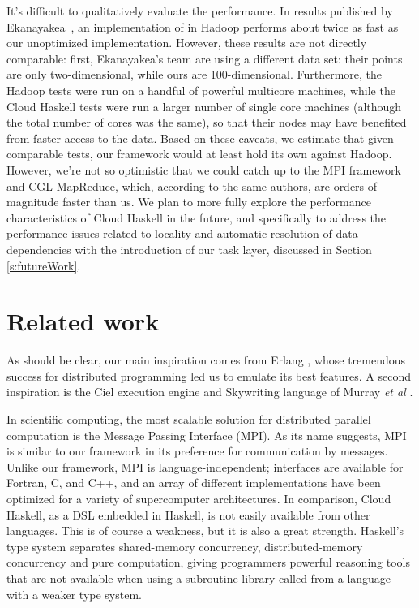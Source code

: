 \documentclass[preprint]{sigplanconf}
\begin{document}
It's difficult to qualitatively evaluate the performance. In results published by Ekanayakea~\cite{indiana}, an implementation of \kmeans{} in Hadoop performs about twice as fast as our unoptimized implementation. 
However, these results are not directly comparable: first, Ekanayakea's team are using a different data set: their points are only two-dimensional, while ours are 100-dimensional. 
Furthermore, the Hadoop tests were run on a handful of powerful multicore machines, while the Cloud Haskell tests were run a larger number of single core machines (although the total number of cores was the same), so that their nodes may have benefited from faster access to the data. 
Based on these caveats, we estimate that given comparable tests, our framework would at least hold its own against Hadoop. 
However, we're not so optimistic that we could catch up to the MPI framework and CGL-MapReduce, which, according to the same authors, are orders of magnitude faster than us. 
We plan to more fully explore the performance characteristics of Cloud Haskell in the future, and specifically to address the performance issues related to locality and automatic resolution of data dependencies with the introduction of our task layer, discussed in Section \ref{s:futureWork}.



\section{Related work} \label{s:related}

As should be clear, our main inspiration comes from Erlang \cite{Erlang93}, whose tremendous
success for distributed programming led us to emulate its best features.
A second inspiration is the Ciel execution engine and Skywriting language
of Murray \emph{et al} \cite{Murray2010, Murray2011}.

In scientific computing, the most scalable solution for distributed parallel computation is the Message Passing Interface (MPI). As its name suggests, MPI is similar to our framework in its preference for communication by messages. Unlike our framework, MPI is language-independent; interfaces are available for Fortran, C, and C++, and an array of different implementations have been optimized for a variety of supercomputer architectures.  In comparison, Cloud Haskell, as a DSL embedded in Haskell, is not easily available from other languages.
This is of course a weakness, but it is also a great strength.  
Haskell's type system separates shared-memory concurrency, distributed-memory concurrency and pure computation, giving programmers powerful reasoning tools that are not available when using a subroutine library called from a language with a weaker type system. 
\end{document}
